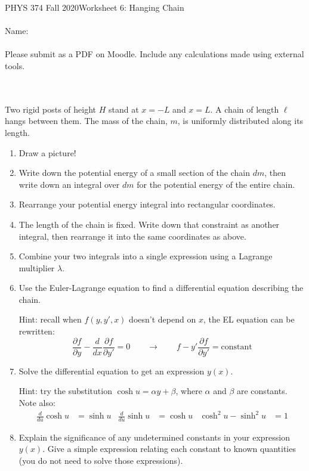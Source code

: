 \documentclass[12pt]{article}
\begin{document}
PHYS 374 Fall 2020\hfill Worksheet 6: Hanging Chain\\
\\
Name:\\
\\
Please submit as a PDF on Moodle. Include any calculations made using external tools.

\hrulefill
\\
\\
Two rigid posts of height $H$ stand at $x=-L$ and $x=L$. A chain of length $\ell$ hangs between them. The mass of the chain, $m$, is uniformly distributed along its length.
\begin{enumerate}
\item Draw a picture!
\item Write down the potential energy of a small section of the chain $dm$, then write down an integral over $dm$ for the potential energy of the entire chain.
\item Rearrange your potential energy integral into rectangular coordinates. 
\item The length of the chain is fixed. Write down that constraint as another integral, then rearrange it into the same coordinates as above.
\item Combine your two integrals into a single expression using a Lagrange multiplier $\lambda$.
\item Use the Euler-Lagrange equation to find a differential equation describing the chain.

Hint: recall when $f(y, y', x)$ doesn't depend on $x$, the EL equation can be rewritten: 
$$
\frac{\partial f}{\partial y} - \frac{d}{dx} \frac{\partial f}{\partial y'} = 0
\quad\quad\rightarrow\quad\quad
f - y' \frac{\partial f}{\partial y'} = \text{constant}
$$
\item Solve the differential equation to get an expression $y(x)$.

Hint: try the substitution $\cosh u = \alpha y + \beta$, where $\alpha$ and $\beta$ are constants. Note also:
\begin{align*}
    \tfrac{d}{du} \cosh u &= \sinh u&
    \tfrac{d}{du} \sinh u &= \cosh u&
    \cosh^2 u - \sinh^2 u &= 1
\end{align*}
\item Explain the significance of any undetermined constants in your expression $y(x)$. Give a simple expression relating each constant to known quantities (you do not need to solve those expressions). 
\end{enumerate}
\end{document}
